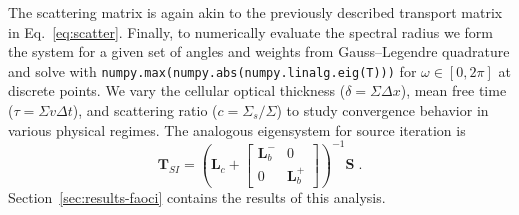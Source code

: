 The scattering matrix is again akin to the previously described transport matrix in Eq.~\eqref{eq:scatter}.
Finally, to numerically evaluate the spectral radius we form the system for a given set of angles and weights from Gauss--Legendre quadrature and solve with \texttt{numpy.max(numpy.abs(numpy.linalg.eig(T)))} for $\omega \in [0,2\pi]$ at discrete points.
We vary the cellular optical thickness ($\delta =\Sigma \Delta x$), mean free time ($\tau = \Sigma v\Delta t$), and scattering ratio ($c=\Sigma_s/\Sigma$) to study convergence behavior in various physical regimes. 
The analogous eigensystem for source iteration is
\begin{equation}
    \bm{T}_{SI} = \left( 
    \bm{L}_c
    + \begin{bmatrix}
        \bm{L}_b^- & 0\\
        0 & \bm{L}_b^+
    \end{bmatrix}
    \right)^{-1}
    \bm{S} \; .
\end{equation} 
Section~\ref{sec:results-faoci} contains the results of this analysis.
